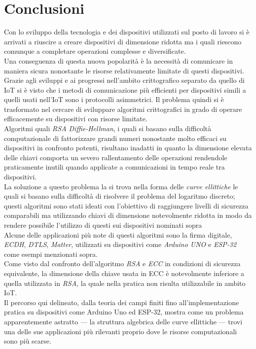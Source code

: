\documentclass[12pt, a4paper]{report}
\begin{document}
\chapter{Conclusioni}
Con lo sviluppo della tecnologia e dei dispositivi utilizzati sul posto di lavoro si è arrivati a riuscire a
creare dispositivi di dimensione ridotta ma i quali riescono comunque a completare operazioni complesse e diversificate.
\\Una conseguenza di questa nuova popolarità è la necessità di comunicare in maniera sicura nonostante le
risorse relativamente limitate di questi dispositivi. Grazie agli sviluppi e ai progressi nell'ambito crittografico 
separato da quello di IoT si è visto che i metodi di comunicazione più efficienti per dispositivi simili a quelli usati nell'IoT sono
i protocolli asimmetrici. Il problema quindi si è trasformato nel cercare di sviluppare algoritmi crittografici 
in grado di operare efficacemente su dispositivi con risorse limitate.
\\ Algoritmi quali \textit{RSA  Diffie-Hellman}, i quali si basano sulla difficoltà computazionale di fattorizzare grandi numeri
nonostante molto efficaci su dispositivi in confronto potenti, 
risultano inadatti in quanto la dimensione elevata delle chiavi comporta un severo rallentamento delle operazioni
rendendole praticamente inutili quando applicate a comunicazioni in tempo reale tra dispositivi.
\\La soluzione a questo problema la si trova nella forma delle \textit{curve ellittiche} le quali si basano sulla difficoltà di risolvere
il problema del logaritmo discreto;
questi algoritmi sono stati ideati con l'obiettivo di raggiungere livelli di sicurezza 
comparabili ma utilizzando chiavi di dimensione notevolmente ridotta in modo da rendere possibile l'utilizzo di questi sui dispositivi nominati sopra
\\Alcune delle applicazioni più note di questi algoritmi sono la firma digitale, \textit{ECDH}, \textit{DTLS}, \textit{Matter}, 
utilizzati su dispositivi come \textit{Arduino UNO} e \textit{ESP-32} come esempi menzionati sopra.
\\Come visto dal confronto dell'algoritmo \textit{RSA} e \textit{ECC} in condizioni di sicurezza equivalente, la dimensione della chiave usata
in ECC è notevolmente inferiore a quella utilizzata in \textit{RSA}, la quale nella pratica non risulta utilizzabile in ambito IoT.
\\Il percorso qui delineato, dalla teoria dei campi finiti fino all'implementazione pratica su dispositivi come Arduino Uno ed ESP-32,
mostra come un problema apparentemente astratto — la struttura algebrica delle curve ellittiche — trovi una delle sue applicazioni più rilevanti 
proprio dove le risorse computazionali sono più scarse.
\end{document}
